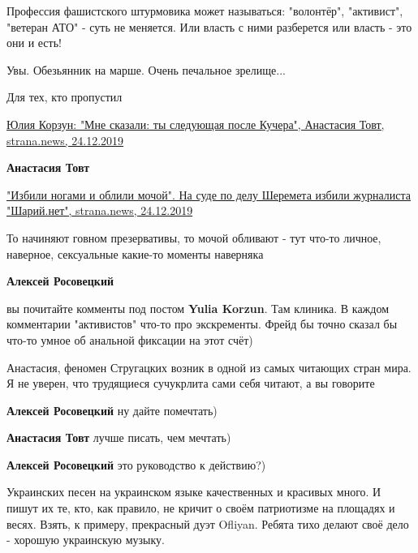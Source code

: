 \begin{itemize}
Профессия фашистского штурмовика может называться: "волонтёр", "активист",
"ветеран АТО" - суть не меняется. Или власть с ними разберется или власть - это
они и есть!


Увы. Обезьянник на марше. Очень печальное зрелище...

Для тех, кто пропустил

\href{https://strana.news/articles/reconstruction/241238-zhurnalistka-stranaua-julija-korzun-rasskazala-ob-uhrozakh-ot-radikalov.html}{%
Юлия Корзун: "Мне сказали: ты следующая после Кучера", %
Анастасия Товт, strana.news, 24.12.2019%
}

\begin{itemize} %
\textbf{Анастасия Товт} 

\href{https://strana.news/news/241166-izbili-nohami-i-oblili-mochoj-na-sude-po-delu-sheremeta-izbili-zhurnalista-sharijnet.html}{%
"Избили ногами и облили мочой".  На суде по делу Шеремета избили журналиста "Шарий.нет", strana.news, 24.12.2019%
}

\end{itemize} %


То начиняют говном презервативы, то мочой обливают - тут что-то личное,
наверное, сексуальные какие-то моменты наверняка

\textbf{Алексей Росовецкий} 

вы почитайте комменты под постом \textbf{Yulia Korzun}. Там клиника. В каждом комментарии
"активистов" что-то про экскременты. Фрейд бы точно сказал бы что-то умное об
анальной фиксации на этот счёт)


Анастасия, феномен Стругацких возник в одной из самых читающих стран мира. Я не
уверен, что трудящиеся сучукрлита сами себя читают, а вы говорите

\begin{itemize} %
\textbf{Алексей Росовецкий} ну дайте помечтать)

\textbf{Анастасия Товт} лучше писать, чем мечтать)

\textbf{Алексей Росовецкий} это руководство к действию?)
\end{itemize} %


Украинских песен на украинском языке качественных и красивых много. И пишут их
те, кто, как правило, не кричит о своём патриотизме на площадях и весях. Взять,
к примеру, прекрасный дуэт Ofliyan. Ребята тихо делают своё дело - хорошую
украинскую музыку.


\end{itemize}
